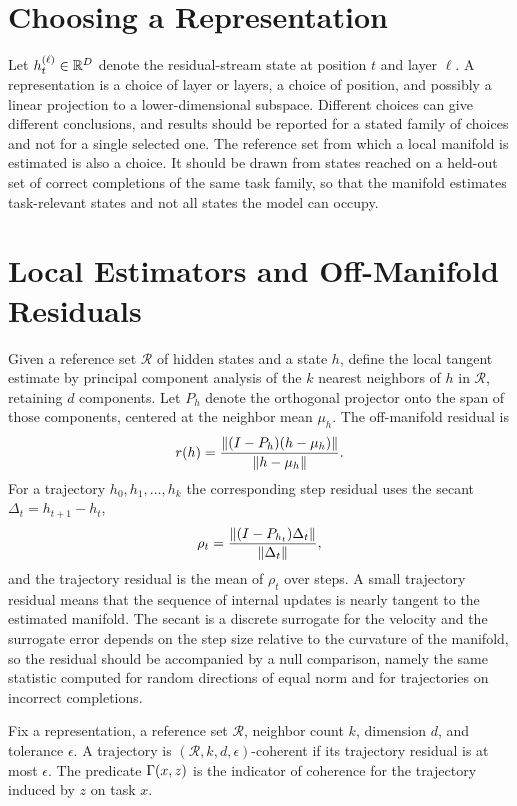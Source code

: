 \section{Choosing a Representation}

Let $h_t^{(\ell)}\in\mathbb{R}^D$ denote the residual-stream state at position $t$ and layer $\ell$. A representation is a choice of layer or layers, a choice of position, and possibly a linear projection to a lower-dimensional subspace. Different choices can give different conclusions, and results should be reported for a stated family of choices and not for a single selected one. The reference set from which a local manifold is estimated is also a choice. It should be drawn from states reached on a held-out set of correct completions of the same task family, so that the manifold estimates task-relevant states and not all states the model can occupy.

\section{Local Estimators and Off-Manifold Residuals}

Given a reference set $\mathcal R$ of hidden states and a state $h$, define the local tangent estimate by principal component analysis of the $k$ nearest neighbors of $h$ in $\mathcal R$, retaining $d$ components. Let $P_h$ denote the orthogonal projector onto the span of those components, centered at the neighbor mean $\mu_h$. The off-manifold residual is
\[
r(h)=\frac{\lVert (I-P_h)(h-\mu_h)\rVert}{\lVert h-\mu_h\rVert}.
\]
For a trajectory $h_0,h_1,\dots,h_k$ the corresponding step residual uses the secant $\Delta_t=h_{t+1}-h_t$,
\[
\rho_t=\frac{\lVert (I-P_{h_t})\Delta_t\rVert}{\lVert \Delta_t\rVert},
\]
and the trajectory residual is the mean of $\rho_t$ over steps. A small trajectory residual means that the sequence of internal updates is nearly tangent to the estimated manifold. The secant is a discrete surrogate for the velocity and the surrogate error depends on the step size relative to the curvature of the manifold, so the residual should be accompanied by a null comparison, namely the same statistic computed for random directions of equal norm and for trajectories on incorrect completions.

\begin{definition}
Fix a representation, a reference set $\mathcal R$, neighbor count $k$, dimension $d$, and tolerance $\epsilon$. A trajectory is $(\mathcal R,k,d,\epsilon)$-coherent if its trajectory residual is at most $\epsilon$. The predicate $\Gamma(x,z)$ is the indicator of coherence for the trajectory induced by $z$ on task $x$.
\end{definition}

